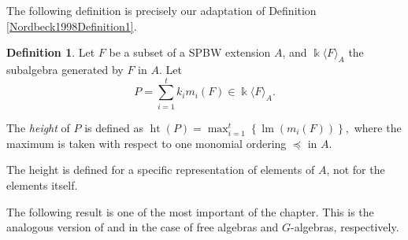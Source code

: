 \documentclass{amsart}
\theoremstyle{definition}
\newtheorem{definition}[theorem]{Definition}
\theoremstyle{remark}
\numberwithin{equation}{section}
\begin{document}
The following definition is precisely our adaptation of Definition \ref{Nordbeck1998Definition1}.

\begin{definition}
Let $F$ be a subset of a SPBW extension $A$, and $\Bbbk\langle F\rangle_{A}$ the  subalgebra generated by $F$ in $A$. Let 
$$
P = \sum\limits_{i=1}^{t} k_{i} m_{i}(F) \in \Bbbk\langle F\rangle_{A}.
$$

The \textit{height} of $P$ is defined as $\operatorname{ht}(P)=\max_{i=1}^{t}\left\{\operatorname{lm}\left(m_{i}(F)\right)\right\},$ where the maximum is taken with respect to one monomial ordering $\preceq$ in $A.$
\end{definition}

The height is defined for a specific representation of elements of $A$, not for the elements itself.

The following result is one of the most important of the chapter. This is the analogous version of  \cite[Theorem 1]{Nordbeck2002} and \cite[Theorem 1]{Khanetal2019} in the case of free algebras and $G$-algebras, respectively.
\end{document}
